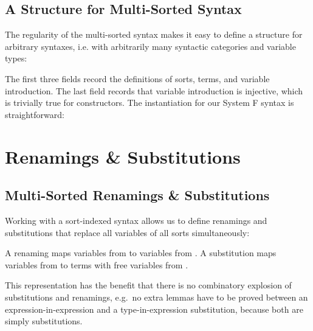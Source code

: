\documentclass[a4paper, UKenglish, cleveref, autoref, thm-restate]{lipics-v2021}
\newenvironment{LibCode*}{%
  \begin{tcolorbox}[%
    colframe=white,%
    boxrule=0.0pt,%
    top=2.5pt,%
    left=2.5pt,%
    bottom=2.5pt,%
    right=2.5pt,%
    before skip=5pt,%
    after skip=5pt,%
    boxsep=0pt%
  ]
}{%
  \end{tcolorbox}%
}
\newenvironment{ExampleCode*}{%
  \begin{tcolorbox}[%
    colframe=white,%
    colback=yellow!5,%
    boxrule=0.0pt,%
    top=2.5pt,%
    left=2.5pt,%
    bottom=2.5pt,%
    right=2.5pt,%
    before skip=5pt,%
    after skip=5pt,%
    boxsep=0pt%
  ]\vspace{-0.2\baselineskip}%
}{%
  \vspace{-1\baselineskip}%
  \end{tcolorbox}%
}
\newcommand*\LibCode[1]{\begin{LibCode*}{#1}\end{LibCode*}}
\newcommand*\AppCode[1]{{#1}}
\newcommand*\ExampleCode[1]{\begin{ExampleCode*}{#1}\end{ExampleCode*}}
\newcommand*\ACode[1]{\AgdaFontStyle{\textcolor{mygray}{#1}}}
\newcommand*\AField[1]{\AgdaField{#1}}
\newcommand*\ACon[1]{\AgdaInductiveConstructor{#1}}
\newcommand*\ADef[1]{\AgdaFunction{#1}}
\begin{document}

  \subsection{A Structure for Multi-Sorted Syntax}
  \label{sec:syntax:structure}
  The regularity of the multi-sorted syntax makes it easy to define a
  structure for arbitrary syntaxes, i.e. with arbitrarily many syntactic categories and variable types:
  \LibCode\KSyntax
  The first three fields record the definitions of sorts, terms, and variable introduction.
  The last field records that variable introduction
  \ACode{\AField{`\_}} is injective, which is trivially true for
  constructors. The instantiation for our System F syntax is
  straightforward:
  \AppCode\FSyntaxInst

  \section{Renamings \& Substitutions}
  \label{sec:maps}
  \subsection{Multi-Sorted Renamings \& Substitutions}
  \label{sec:maps:example}
  Working with a sort-indexed syntax allows us to define renamings and substitutions
  that replace all variables of all sorts simultaneously:

  \ExampleCode\FExampleSubRen

  A renaming \ACode{S₁ \ADef{→ᵣ} S₂} maps variables from \ACode{S₁} to
  variables from \ACode{S₂}.
  A substitution \ACode{S₁ \ADef{→ₛ} S₂} maps variables from \ACode{S₁} to
  terms with free variables from \ACode{S₂}.


  This representation has the benefit that there is no combinatory
  explosion of substitutions and renamings, e.g.\ no extra lemmas have to be
  proved between an expression-in-expression and a type-in-expression
  substitution, because both are simply substitutions.
\end{document}
